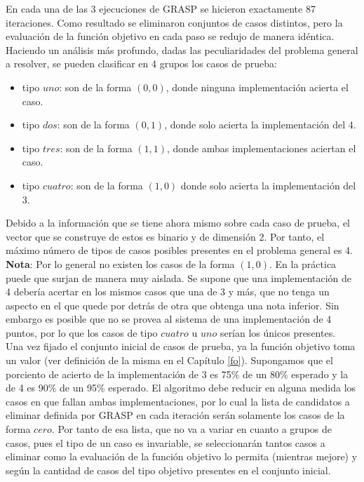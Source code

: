 \documentclass[a4paper,openright,11pt,oneside]{book}
\begin{document}
	En cada una de las 3 ejecuciones de GRASP se hicieron exactamente 87 iteraciones. Como resultado se eliminaron conjuntos de casos distintos, pero la evaluación de la función objetivo en cada paso se redujo de manera idéntica. \\
	
	Haciendo un análisis más profundo, dadas las peculiaridades del problema general a resolver, se pueden clasificar en 4 grupos los casos de prueba:
	
	\begin{itemize}
		\item tipo $uno$: son de la forma $(0, 0)$, donde ninguna implementación acierta el caso.
		\item tipo $dos$: son de la forma $(0, 1)$, donde solo acierta la implementación del 4.
		\item tipo $tres$: son de la forma $(1, 1)$, donde ambas implementaciones aciertan el caso.
		\item tipo $cuatro$: son de la forma $(1, 0)$ donde solo acierta la implementación del 3.
	\end{itemize}

	Debido a la información que se tiene ahora mismo sobre cada caso de prueba, el vector que se construye de estos es binario y de dimensión 2. Por tanto, el máximo número de tipos de casos posibles presentes en el problema general es 4.\\

	\textbf{Nota}: Por lo general no existen los casos de la forma $(1, 0)$. En la práctica puede que surjan de manera muy aislada. Se supone que una implementación de 4 debería acertar en los mismos casos que una de 3 y más, que no tenga un aspecto en el que quede por detrás de otra que obtenga una nota inferior. Sin embargo es posible que no se provea al sistema de una implementación de 4 puntos, por lo que los casos de tipo $cuatro$ u $uno$ serían los únicos presentes.\\
 
 	Una vez fijado el conjunto inicial de casos de prueba, ya la función objetivo toma un valor (ver definición de la misma en el Capítulo \ref{fo}). Supongamos que el porciento de acierto de la implementación de 3 es 75\% de un 80\% esperado y la de 4 es 90\% de un 95\% esperado. El algoritmo debe reducir en alguna medida los casos en que fallan ambas implementaciones, por lo cual la lista de candidatos a eliminar definida por GRASP en cada iteración serán solamente los casos de la forma $cero$. Por tanto de esa lista, que no va a variar en cuanto a grupos de casos, pues el tipo de un caso es invariable, se seleccionarán tantos casos a eliminar como la evaluación de la función objetivo lo permita (mientras mejore) y según la cantidad de casos del tipo objetivo presentes en el conjunto inicial.
 	
\end{document}
